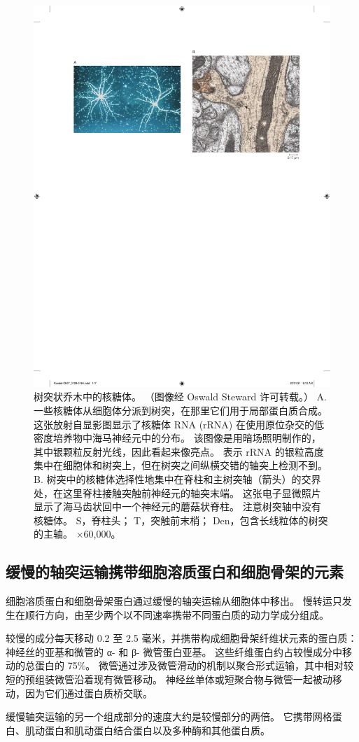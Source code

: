 \begin{figure}[htbp]
	\centering
	\includegraphics[width=0.5\linewidth]{chap07/fig_7_12}
	\caption{树突状乔木中的核糖体。 （图像经 Oswald Steward 许可转载。） A. 一些核糖体从细胞体分派到树突，在那里它们用于局部蛋白质合成。 这张放射自显影图显示了核糖体 RNA (rRNA) 在使用原位杂交的低密度培养物中海马神经元中的分布。 该图像是用暗场照明制作的，其中银颗粒反射光线，因此看起来像亮点。 表示 rRNA 的银粒高度集中在细胞体和树突上，但在树突之间纵横交错的轴突上检测不到。 B. 树突中的核糖体选择性地集中在脊柱和主树突轴（箭头）的交界处，在这里脊柱接触突触前神经元的轴突末端。 这张电子显微照片显示了海马齿状回中一个神经元的蘑菇状脊柱。 注意树突轴中没有核糖体。 S，脊柱头； T，突触前末梢； Den，包含长线粒体的树突的主轴。 ×60,000。}
	\label{fig:7_12}
\end{figure}


\subsection{缓慢的轴突运输携带细胞溶质蛋白和细胞骨架的元素}

细胞溶质蛋白和细胞骨架蛋白通过缓慢的轴突运输从细胞体中移出。
慢转运只发生在顺行方向，由至少两个以不同速率携带不同蛋白质的动力学成分组成。


较慢的成分每天移动 0.2 至 2.5 毫米，并携带构成细胞骨架纤维状元素的蛋白质：神经丝的亚基和微管的 α- 和 β- 微管蛋白亚基。
这些纤维蛋白约占较慢成分中移动的总蛋白的 75\%。 
微管通过涉及微管滑动的机制以聚合形式运输，其中相对较短的预组装微管沿着现有微管移动。
神经丝单体或短聚合物与微管一起被动移动，因为它们通过蛋白质桥交联。


缓慢轴突运输的另一个组成部分的速度大约是较慢部分的两倍。
它携带网格蛋白、肌动蛋白和肌动蛋白结合蛋白以及多种酶和其他蛋白质。



